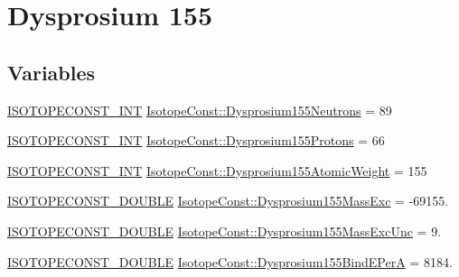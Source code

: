 \hypertarget{group___isotope_const-_dysprosium-_dy155}{}\section{Dysprosium 155}
\label{group___isotope_const-_dysprosium-_dy155}
\subsection*{Variables}
\begin{DoxyCompactItemize}
\item 
\mbox{\hyperlink{group___isotope_const-_macros_ga5f18360b3e99483a35c32d789e62621c}{I\+S\+O\+T\+O\+P\+E\+C\+O\+N\+S\+T\+\_\+\+I\+NT}} \mbox{\hyperlink{group___isotope_const-_dysprosium-_dy155_gad447e4f3df776710b172458d3392a777}{Isotope\+Const\+::\+Dysprosium155\+Neutrons}} = 89
\item 
\mbox{\hyperlink{group___isotope_const-_macros_ga5f18360b3e99483a35c32d789e62621c}{I\+S\+O\+T\+O\+P\+E\+C\+O\+N\+S\+T\+\_\+\+I\+NT}} \mbox{\hyperlink{group___isotope_const-_dysprosium-_dy155_gaa91bef6e4bd32297d423978cc7bd5f9a}{Isotope\+Const\+::\+Dysprosium155\+Protons}} = 66
\item 
\mbox{\hyperlink{group___isotope_const-_macros_ga5f18360b3e99483a35c32d789e62621c}{I\+S\+O\+T\+O\+P\+E\+C\+O\+N\+S\+T\+\_\+\+I\+NT}} \mbox{\hyperlink{group___isotope_const-_dysprosium-_dy155_ga67bbe67ae6629b99c85be98cca5d875c}{Isotope\+Const\+::\+Dysprosium155\+Atomic\+Weight}} = 155
\item 
\mbox{\hyperlink{group___isotope_const-_macros_ga8f45a7272ce02c0b4c65c44636ed719a}{I\+S\+O\+T\+O\+P\+E\+C\+O\+N\+S\+T\+\_\+\+D\+O\+U\+B\+LE}} \mbox{\hyperlink{group___isotope_const-_dysprosium-_dy155_ga9cf8f2b97e52648fd3d3efd7ad7b7e0b}{Isotope\+Const\+::\+Dysprosium155\+Mass\+Exc}} = -\/69155.
\item 
\mbox{\hyperlink{group___isotope_const-_macros_ga8f45a7272ce02c0b4c65c44636ed719a}{I\+S\+O\+T\+O\+P\+E\+C\+O\+N\+S\+T\+\_\+\+D\+O\+U\+B\+LE}} \mbox{\hyperlink{group___isotope_const-_dysprosium-_dy155_ga99d988ddadeb2dcf9d339e2ff118b739}{Isotope\+Const\+::\+Dysprosium155\+Mass\+Exc\+Unc}} = 9.
\item 
\mbox{\hyperlink{group___isotope_const-_macros_ga8f45a7272ce02c0b4c65c44636ed719a}{I\+S\+O\+T\+O\+P\+E\+C\+O\+N\+S\+T\+\_\+\+D\+O\+U\+B\+LE}} \mbox{\hyperlink{group___isotope_const-_dysprosium-_dy155_ga8502529cc84d95ebb2d3377faba161c2}{Isotope\+Const\+::\+Dysprosium155\+Bind\+E\+PerA}} = 8184.
\item 

\end{DoxyCompactItemize}
